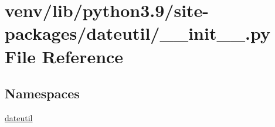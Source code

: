 \hypertarget{venv_2lib_2python3_89_2site-packages_2dateutil_2____init_____8py}{}\section{venv/lib/python3.9/site-\/packages/dateutil/\+\_\+\+\_\+init\+\_\+\+\_\+.py File Reference}
\label{venv_2lib_2python3_89_2site-packages_2dateutil_2____init_____8py}
\subsection*{Namespaces}
\begin{DoxyCompactItemize}
\item 
 \hyperlink{namespacedateutil}{dateutil}
\end{DoxyCompactItemize}
